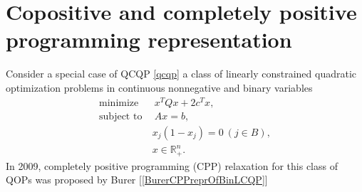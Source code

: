 \documentclass[12pt]{book}
\theoremstyle{definition}
\begin{document}
%
%
%



\section{Copositive and completely positive programming representation}

Consider a special case of QCQP {\ref{qcqp}} a class of linearly constrained quadratic optimization problems in continuous nonnegative and binary variables
\begin{equation}
\label{BinaryQP}
\begin{array}{ll}
\mbox{minimize}&\ \ x^TQx + 2c^Tx ,\\
\mbox{subject to}&\ \ Ax = b,\\
				 & \ x_j(1-x_j) = 0 \ (j \in B), \\
				 &\ x\in \mathbb{R}^n_+. 
\end{array}
\end{equation}
In 	2009, completely positive programming (CPP) relaxation for this class of QOPs was proposed
by Burer [\ref{BurerCPPreprOfBinLCQP}] 
\end{document}
